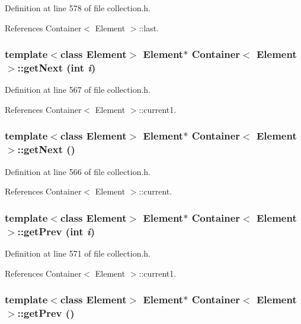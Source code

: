 Definition at line 578 of file collection.h.

References Container$<$ Element $>$::last.\hypertarget{classContainer_027eaac76676e187ae5f849acb84237a}{
\subsubsection[{getNext}]{\setlength{\rightskip}{0pt plus 5cm}template$<$class Element$>$ Element$\ast$ {\bf Container}$<$ Element $>$::getNext (int {\em i})}}
\label{classContainer_027eaac76676e187ae5f849acb84237a}




Definition at line 567 of file collection.h.

References Container$<$ Element $>$::current1.\hypertarget{classContainer_fd45917f5293ac94750cd8c1c5c2c4a9}{
\subsubsection[{getNext}]{\setlength{\rightskip}{0pt plus 5cm}template$<$class Element$>$ Element$\ast$ {\bf Container}$<$ Element $>$::getNext ()}}
\label{classContainer_fd45917f5293ac94750cd8c1c5c2c4a9}




Definition at line 566 of file collection.h.

References Container$<$ Element $>$::current.\hypertarget{classContainer_b75a038f82adad65e3b202b6843cdb4c}{
\subsubsection[{getPrev}]{\setlength{\rightskip}{0pt plus 5cm}template$<$class Element$>$ Element$\ast$ {\bf Container}$<$ Element $>$::getPrev (int {\em i})}}
\label{classContainer_b75a038f82adad65e3b202b6843cdb4c}




Definition at line 571 of file collection.h.

References Container$<$ Element $>$::current1.\hypertarget{classContainer_980834c42829d68fd640a86aa9d8051e}{
\subsubsection[{getPrev}]{\setlength{\rightskip}{0pt plus 5cm}template$<$class Element$>$ Element$\ast$ {\bf Container}$<$ Element $>$::getPrev ()}}
\label{classContainer_980834c42829d68fd640a86aa9d8051e}




